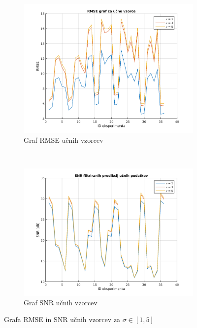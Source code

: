 \begin{figure}[!htb]
	\centering
	\begin{subfigure}[t]{0.45\columnwidth}
		\includegraphics[width=\columnwidth]{./Slike/sigma-rmse1-5.png}
		\caption{Graf RMSE  učnih vzorcev }
		\label{fig:sigma-rmse1-5}
	\end{subfigure}
	~
	\begin{subfigure}[t]{0.45\columnwidth}
		\includegraphics[width=\columnwidth]{./Slike/sigma-snr1-5.png}
		\caption{Graf SNR  učnih vzorcev}
		\label{fig:sigma-snr1-5}
	\end{subfigure}
	\caption{Grafa RMSE in SNR učnih vzorcev za \mbox{$\sigma \in [1,5]$}}
	\label{fig:sigma1-5}
\end{figure}

